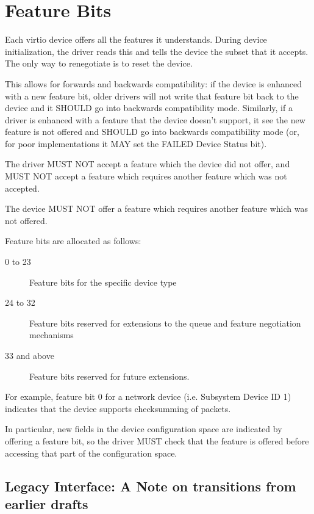 \section{Feature Bits}\label{sec:Basic Facilities of a Virtio Device / Feature Bits}

Each virtio device offers all the features it understands.  During
device initialization, the driver reads this and tells the device the
subset that it accepts.  The only way to renegotiate is to reset
the device.

This allows for forwards and backwards compatibility: if the device is
enhanced with a new feature bit, older drivers will not write that
feature bit back to the device and it SHOULD go into backwards
compatibility mode. Similarly, if a driver is enhanced with a feature
that the device doesn't support, it see the new feature is not offered
and SHOULD go into backwards compatibility mode (or, for poor
implementations it MAY set the FAILED Device Status bit).

The driver MUST NOT accept a feature which the device did not offer,
and MUST NOT accept a feature which requires another feature which was
not accepted.

The device MUST NOT offer a feature which requires another feature
which was not offered.

Feature bits are allocated as follows:

\begin{description}
\item[0 to 23] Feature bits for the specific device type

\item[24 to 32] Feature bits reserved for extensions to the queue and
  feature negotiation mechanisms

\item[33 and above] Feature bits reserved for future extensions.
\end{description}

For example, feature bit 0 for a network device (i.e. Subsystem
Device ID 1) indicates that the device supports checksumming of
packets.

In particular, new fields in the device configuration space are
indicated by offering a feature bit, so the driver MUST check that the
feature is offered before accessing that part of the configuration
space.

\subsection{Legacy Interface: A Note on transitions from earlier drafts}\label{sec:Basic Facilities of a Virtio Device / Feature Bits / Legacy Interface: A Note on transitions from earlier drafts}

